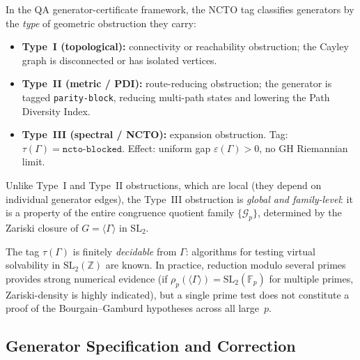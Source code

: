 \begin{remark}
  \label{rem:ncto_type}
  In the QA generator-certificate framework, the NCTO tag classifies generators by
  the \emph{type} of geometric obstruction they carry:
  \begin{itemize}
    \item \textbf{Type~I (topological):} connectivity or reachability obstruction;
      the Cayley graph is disconnected or has isolated vertices.
    \item \textbf{Type~II (metric / PDI):} route-reducing obstruction; the generator
      is tagged \texttt{parity-block}, reducing multi-path states and lowering the
      Path Diversity Index.
    \item \textbf{Type~III (spectral / NCTO):} expansion obstruction.
      Tag: $\tau(\Gamma) = \texttt{ncto-blocked}$.
      Effect: uniform gap $\varepsilon(\Gamma) > 0$, no GH Riemannian limit.
  \end{itemize}
  Unlike Type~I and Type~II obstructions, which are local (they depend on individual
  generator edges), the Type~III obstruction is \emph{global and family-level}: it
  is a property of the entire congruence quotient family $\{\mathcal{G}_p\}$,
  determined by the Zariski closure of $G = \langle\Gamma\rangle$ in $\mathrm{SL}_2$.

  The tag $\tau(\Gamma)$ is finitely \emph{decidable} from $\Gamma$: algorithms
  for testing virtual solvability in $\mathrm{SL}_2(\mathbb{Z})$ are known.
  In practice, reduction modulo several primes provides strong numerical evidence
  (if $\rho_p(\langle\Gamma\rangle) = \mathrm{SL}_2(\mathbb{F}_p)$ for multiple
  primes, Zariski-density is highly indicated), but a single prime test does not
  constitute a proof of the Bourgain--Gamburd hypotheses across all large~$p$.
\end{remark}

\subsection{Generator Specification and Correction}
\label{sec:harmonic:generators}

